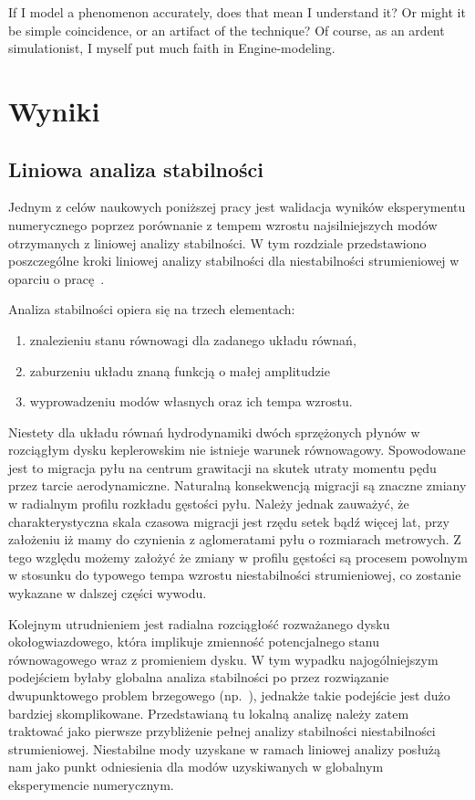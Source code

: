 \begin{savequote}[75mm]
   If I model a phenomenon accurately, does that mean I understand it? Or might it be simple coincidence, or an artifact
   of the technique? Of course, as an ardent simulationist, I myself put much faith in Engine-modeling.
\end{savequote}

\chapter{Wyniki}

\section{Liniowa analiza stabilności}
\label{sec:lsa}
Jednym z celów naukowych poniższej pracy jest walidacja wyników eksperymentu
numerycznego poprzez porównanie z tempem wzrostu najsilniejszych modów
otrzymanych z liniowej analizy stabilności. W tym rozdziale przedstawiono
poszczególne kroki liniowej analizy stabilności dla niestabilności strumieniowej
w oparciu o pracę~\citep{YG05}.

Analiza stabilności opiera się na trzech elementach:
\begin{enumerate}
   \item znalezieniu stanu równowagi dla zadanego układu równań,
   \item zaburzeniu układu znaną funkcją o małej amplitudzie 
   \item wyprowadzeniu modów własnych oraz ich tempa wzrostu.
\end{enumerate}
Niestety dla układu równań hydrodynamiki dwóch sprzężonych płynów w rozciągłym
dysku keplerowskim nie istnieje warunek równowagowy. Spowodowane jest to
migracja pyłu na centrum grawitacji na skutek utraty momentu pędu przez tarcie
aerodynamiczne. Naturalną konsekwencją migracji są znaczne zmiany w radialnym
profilu rozkładu gęstości pyłu. Należy jednak zauważyć, że charakterystyczna
skala czasowa migracji jest rzędu setek bądź więcej lat, przy założeniu iż mamy
do czynienia z aglomeratami pyłu o rozmiarach metrowych. Z tego względu możemy
założyć że zmiany w profilu gęstości są procesem powolnym w stosunku do typowego
tempa wzrostu niestabilności strumieniowej, co zostanie wykazane w dalszej
części wywodu.

Kolejnym utrudnieniem jest radialna rozciągłość rozważanego dysku
okołogwiazdowego, która implikuje zmienność potencjalnego stanu równowagowego
wraz z promieniem dysku. W tym wypadku najogólniejszym podejściem byłaby
globalna analiza stabilności po przez rozwiązanie dwupunktowego problem
brzegowego (np.~\cite{PHM04, KH06}), jednakże takie podejście jest dużo bardziej
skomplikowane. Przedstawianą tu lokalną analizę należy zatem traktować jako
pierwsze przybliżenie pełnej analizy stabilności niestabilności strumieniowej.
Niestabilne mody uzyskane w ramach liniowej analizy posłużą nam jako punkt
odniesienia dla modów uzyskiwanych w globalnym eksperymencie numerycznym.

